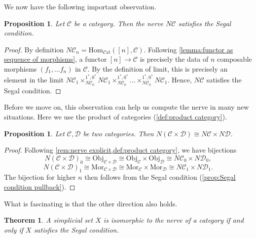 \documentclass[11pt, a4paper]{amsart}
\newcommand{\cC}{\mathcal{C}}
\newcommand{\cD}{\mathcal{D}}
\newcommand{\Hom}{\mathrm{Hom}}
\newcommand{\Mor}{\mathrm{Mor}}
\newcommand{\Cat}{\mathscr{C}\mathrm{at}}
\newcommand{\Obj}{\mathrm{Obj}}
\newtheorem{theorem}[equation]{Theorem}
\newtheorem{proposition}[equation]{Proposition}
\theoremstyle{definition}
\theoremstyle{remark}
\numberwithin{equation}{section}
\begin{document}
We now have the following important observation.
\begin{proposition} \label{prop:nerve Segal}
 Let $\cC$ be a category. Then the nerve $N\cC$ satisfies the Segal condition.  
\end{proposition}

\begin{proof}
 By definition $N\cC_n = \Hom_{\Cat}([n],\cC)$. Following \cref{lemma:functor as sequence of morphisms}, a functor $[n] \to \cC$ is precisely the data of $n$ composable morphisms $(f_1, ... f_n)$ in $\cC$. By the definition of limit, this is precisely an element in the limit $N\cC_1 \times_{N\cC_0}^{1^*,0^*} N\cC_1 \times_{N\cC_0}^{1^*,0^*} ... \times_{N\cC_0}^{1^*,0^*} N\cC_1$. Hence, $N\cC$ satisfies the Segal condition.
\end{proof}

Before we move on, this observation can help us compute the nerve in many new situations. Here we use the product of categories (\cref{def:product category}).

\begin{proposition} \label{prop:nerve product}
  Let $\cC, \cD$ be two categories. Then $N(\cC \times \cD) \cong N\cC \times N\cD$.
\end{proposition}

\begin{proof}
 Following \cref{rem:nerve explicit,def:product category}, we have bijections
  \[N(\cC \times \cD)_0 \cong \Obj_{\cC \times \cD} \cong \Obj_{\cC} \times \Obj_{\cD} \cong N\cC_0 \times N\cD_0, \]
  \[N(\cC \times \cD)_1 \cong \Mor_{\cC \times \cD} \cong \Mor_{\cC} \times \Mor_{\cD} \cong N\cC_1 \times N\cD_1. \]
 The bijection for higher $n$ then follows from the Segal condition (\cref{prop:Segal condition pullback}).
\end{proof}

What is fascinating is that the other direction also holds.

\begin{theorem} \label{thm:nerve image}
  A simplicial set $X$ is isomorphic to the nerve of a category if and only if $X$ satisfies the Segal condition.
\end{theorem}
\end{document}
